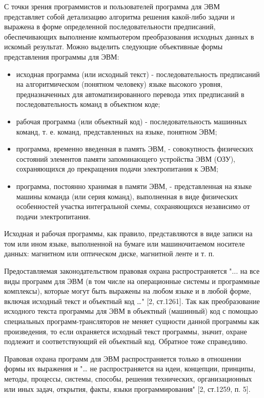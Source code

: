     С точки зрения программистов и пользователей программа для ЭВМ представляет собой детализацию алгоритма решения какой-либо задачи и выражена в форме определенной последовательности предписаний, обеспечивающих выполнение компьютером преобразования исходных данных в искомый результат. Можно выделить следующие объективные формы представления программы для ЭВМ:

    \begin{itemize}
        \item исходная программа (или исходный текст) - последовательность предписаний на алгоритмическом (понятном человеку) языке высокого уровня, предназначенных для автоматизированного перевода этих предписаний в последовательность команд в объектном коде;
        \item рабочая программа (или объектный код) - последовательность машинных команд, т. е. команд, представленных на языке, понятном ЭВМ;
        \item программа, временно введенная в память ЭВМ, - совокупность физических состояний элементов памяти запоминающего устройства ЭВМ (ОЗУ), сохраняющихся до прекращения подачи электропитания к ЭВМ;
        \item программа, постоянно хранимая в памяти ЭВМ, - представленная на языке машины команда (или серия команд), выполненная в виде физических особенностей участка интегральной схемы, сохраняющихся независимо от подачи электропитания.
    \end{itemize}

    Исходная и рабочая программы, как правило, представляются в виде записи на том или ином языке, выполненной на бумаге или машиночитаемом носителе данных: магнитном или оптическом диске, магнитной ленте и т. п.

    Предоставляемая законодательством правовая охрана распространяется "... на все виды программ для ЭВМ (в том числе на операционные системы и программные комплексы), которые могут быть выражены на любом языке и в любой форме, включая исходный текст и объектный код …" [2, ст.1261]. Так как преобразование исходного текста программы для ЭВМ в объектный (машинный) код с помощью специальных программ-трансляторов не меняет сущности данной программы как произведения, то если охраняется исходный текст программы, значит, охране подлежит и соответствующий ей объектный код. Обратное тоже справедливо.

    Правовая охрана программ для ЭВМ распространяется только в отношении формы их выражения и "… не распространяется на идеи, концепции, принципы, методы, процессы, системы, способы, решения технических, организационных или иных задач, открытия, факты, языки программирования" [2, ст.1259, п. 5].

